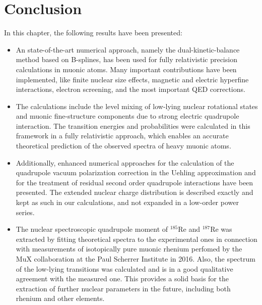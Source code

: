 \section{Conclusion}
\label{sec:muon_summary}
In this chapter, the following results have been presented:\\
\begin{itemize}
\setlength{\itemsep}{0.75cm}
\item An state-of-the-art numerical approach, namely the dual-kinetic-balance method based on B-splines, has been used for fully relativistic precision calculations in muonic atoms. Many important contributions have been implemented, like finite nuclear size effects, magnetic and electric hyperfine interactions, electron screening, and the most important QED corrections. 

\item The calculations include the level mixing of low-lying nuclear rotational states and muonic fine-structure components due to strong electric quadrupole interaction. The transition energies and probabilities were calculated in this framework in a fully relativistic approach, which enables an accurate theoretical prediction of the observed spectra of heavy muonic atoms.
\item Additionally, enhanced numerical approaches for the calculation of the quadrupole vacuum polarization correction in the Uehling approximation and for the treatment of residual second order quadrupole interactions have been presented. The extended nuclear charge distribution is described exactly and kept as such in our calculations, and not expanded in a low-order power series.
\item The nuclear spectroscopic quadrupole moment of $^{185}$Re and $^{187}$Re was extracted by fitting theoretical spectra to the experimental ones in connection with measurements of isotopically pure muonic rhenium perfomed by the MuX collaboration at the Paul Scherrer Institute in 2016. Also, the spectrum of the low-lying transitions was calculated and is in a good qualitative agreement with the measured one. This provides a solid basis for the extraction of further nuclear parameters in the future, including both rhenium and other elements.
\end{itemize}
